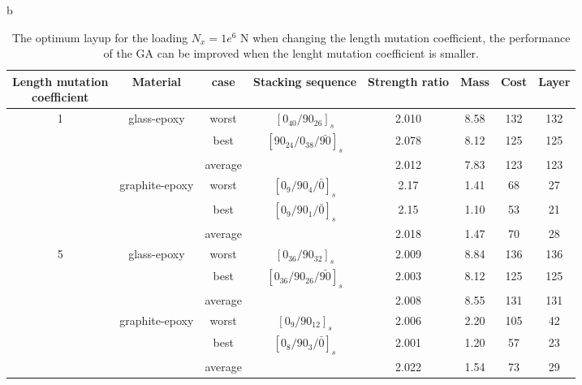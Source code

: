 \renewcommand{\arraystretch}{1.2}
\begin{table}{b}
\caption{The optimum layup for the loading $N_x=1e^6$ N when changing the
length mutation coefficient, the performance of the GA can be improved
when the lenght mutation coefficient is smaller.} \centering
\begin{adjustbox}{width=0.5\textwidth}
	\begin{tabular}{cccccccc}
	\toprule
	\makecell{Length mutation \\ coefficient}		     &	 Material		               	 & case     & Stacking sequence    & Strength ratio  & Mass  &  Cost   & Layer    \\ 
	\midrule																															  
	\multirow{6}{*}{1} &	\multirow{3}{*}{glass-epoxy}   	 & worst     &  $[0_{40}/90_{26}]_s$ & 2.010           &  8.58  & 132     & 132   \\
					   &								     & best      &  $[90_{24}/0_{38}/\bar{90}]_s$ & 2.078  &  8.12  & 125     & 125  \\
					     &									 & average   &    		           & 2.012           &  7.83  & 123     & 123  \\
						 &	\multirow{3}{*}{graphite-epoxy}	 & worst     &  $[0_{9}/90_{4}/\bar{0}]_s$ & 2.17             & 1.41   & 68      & 27      \\
					     &								     & best      &  $[0_{9}/90_{1}/\bar{0}]_s$  & 2.15           & 1.10   & 53      & 21      \\
					     &								     & average   &                     & 2.018           & 1.47   & 70      & 28      \\ 
	\multirow{6}{*}{5} &	\multirow{3}{*}{glass-epoxy}   	 & worst     &  $[0_{36}/90_{32}]_s$ &  2.009          & 8.84   &  136    &  136   \\
					   &								     & best      &  $[0_{36}/90_{26}/\bar{90}]_s$ &  2.003          & 8.12   &  125    &  125   \\
					     &									 & average   &                     &  2.008          & 8.55   &  131    &  131  \\
						 &	\multirow{3}{*}{graphite-epoxy}	 & worst     &  $[0_{9}/90_{12}]_s$ &  2.006          & 2.20   &  105    &  42  \\
						 &								     & best      &  $[0_{8}/90_{3}/\bar{0}]_s$  &  2.001          & 1.20   &  57     &  23  \\
					     &								     & average   &                    &   2.022          & 1.54   &  73     &  29  \\
	\bottomrule																															  
\end{tabular}
\end{adjustbox}
\label{tab:optimum_layup}
\end{table}
            
            
